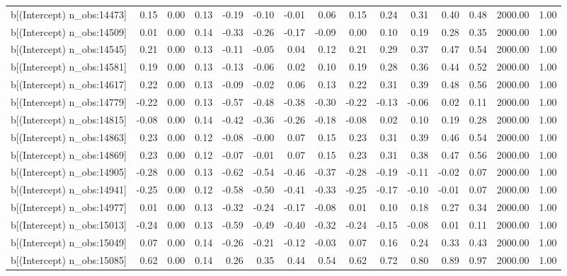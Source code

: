 \begin{table}[ht]
\begin{tabular}{rrrrrrrrrrrrrrr}
  b[(Intercept) n\_obs:14473] & 0.15 & 0.00 & 0.13 & -0.19 & -0.10 & -0.01 & 0.06 & 0.15 & 0.24 & 0.31 & 0.40 & 0.48 & 2000.00 & 1.00 \\ 
  b[(Intercept) n\_obs:14509] & 0.01 & 0.00 & 0.14 & -0.33 & -0.26 & -0.17 & -0.09 & 0.00 & 0.10 & 0.19 & 0.28 & 0.35 & 2000.00 & 1.00 \\ 
  b[(Intercept) n\_obs:14545] & 0.21 & 0.00 & 0.13 & -0.11 & -0.05 & 0.04 & 0.12 & 0.21 & 0.29 & 0.37 & 0.47 & 0.54 & 2000.00 & 1.00 \\ 
  b[(Intercept) n\_obs:14581] & 0.19 & 0.00 & 0.13 & -0.13 & -0.06 & 0.02 & 0.10 & 0.19 & 0.28 & 0.36 & 0.44 & 0.52 & 2000.00 & 1.00 \\ 
  b[(Intercept) n\_obs:14617] & 0.22 & 0.00 & 0.13 & -0.09 & -0.02 & 0.06 & 0.13 & 0.22 & 0.31 & 0.39 & 0.48 & 0.56 & 2000.00 & 1.00 \\ 
  b[(Intercept) n\_obs:14779] & -0.22 & 0.00 & 0.13 & -0.57 & -0.48 & -0.38 & -0.30 & -0.22 & -0.13 & -0.06 & 0.02 & 0.11 & 2000.00 & 1.00 \\ 
  b[(Intercept) n\_obs:14815] & -0.08 & 0.00 & 0.14 & -0.42 & -0.36 & -0.26 & -0.18 & -0.08 & 0.02 & 0.10 & 0.19 & 0.28 & 2000.00 & 1.00 \\ 
  b[(Intercept) n\_obs:14863] & 0.23 & 0.00 & 0.12 & -0.08 & -0.00 & 0.07 & 0.15 & 0.23 & 0.31 & 0.39 & 0.46 & 0.54 & 2000.00 & 1.00 \\ 
  b[(Intercept) n\_obs:14869] & 0.23 & 0.00 & 0.12 & -0.07 & -0.01 & 0.07 & 0.15 & 0.23 & 0.31 & 0.38 & 0.47 & 0.56 & 2000.00 & 1.00 \\ 
  b[(Intercept) n\_obs:14905] & -0.28 & 0.00 & 0.13 & -0.62 & -0.54 & -0.46 & -0.37 & -0.28 & -0.19 & -0.11 & -0.02 & 0.07 & 2000.00 & 1.00 \\ 
  b[(Intercept) n\_obs:14941] & -0.25 & 0.00 & 0.12 & -0.58 & -0.50 & -0.41 & -0.33 & -0.25 & -0.17 & -0.10 & -0.01 & 0.07 & 2000.00 & 1.00 \\ 
  b[(Intercept) n\_obs:14977] & 0.01 & 0.00 & 0.13 & -0.32 & -0.24 & -0.17 & -0.08 & 0.01 & 0.10 & 0.18 & 0.27 & 0.34 & 2000.00 & 1.00 \\ 
  b[(Intercept) n\_obs:15013] & -0.24 & 0.00 & 0.13 & -0.59 & -0.49 & -0.40 & -0.32 & -0.24 & -0.15 & -0.08 & 0.01 & 0.11 & 2000.00 & 1.00 \\ 
  b[(Intercept) n\_obs:15049] & 0.07 & 0.00 & 0.14 & -0.26 & -0.21 & -0.12 & -0.03 & 0.07 & 0.16 & 0.24 & 0.33 & 0.43 & 2000.00 & 1.00 \\ 
  b[(Intercept) n\_obs:15085] & 0.62 & 0.00 & 0.14 & 0.26 & 0.35 & 0.44 & 0.54 & 0.62 & 0.72 & 0.80 & 0.89 & 0.97 & 2000.00 & 1.00 \\ 

\end{tabular}
\end{table}
